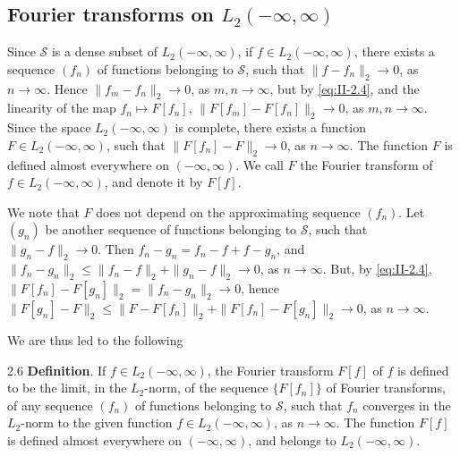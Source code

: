 \subsection*{Fourier transforms on $L_{2}(-\infty,\infty)$}
\noindent Since $\mathcal S$ is a dense subset of $L_{2}(-\infty,\infty)$, if $f\in L_{2}(-\infty,\infty)$, there exists a sequence $(f_{n})$ of functions belonging to $\mathcal S$, such that $\|f-f_{n}\|_{2}\to 0$, as $n\to\infty$. Hence $\|f_{m}-f_{n}\|_{2}\to 0$, as $m,n\to\infty$, but by \eqref{eq:II-2.4}, and the linearity of the map $f_{n}\mapsto F[f_{n}]$, $\|F[f_{m}]-F[f_{n}]\|_{2}\to 0$, as $m,n\to\infty$. Since the space $L_{2}(-\infty,\infty)$ is complete, there exists a function $F\in L_{2}(-\infty,\infty)$, such that $\|F[f_{n}]-F\|_{2}\to 0$, as $n\to\infty$. The function $F$ is defined almost everywhere on $(-\infty,\infty)$. We call $F$ the Fourier transform of $f\in L_{2}(-\infty,\infty)$, and denote it by $F[f]$.

We note that $F$ does not depend on the approximating sequence $(f_{n})$. Let $(g_{n})$ be another sequence of functions belonging to $\mathcal S$, such that $\|g_{n}-f\|_{2}\to 0$. Then $f_{n}-g_{n}=f_{n}-f+f-g_{n}$, and $\|f_{n}-g_{n}\|_{2}\le \|f_{n}-f\|_{2}+\|g_{n}-f\|_{2}\to 0$, as $n\to\infty$. But, by \eqref{eq:II-2.4}, $\|F[f_{n}]-F[g_{n}]\|_{2}=\|f_{n}-g_{n}\|_{2}\to 0$, hence $\|F[g_{n}]-F\|_{2}\le \|F-F[f_{n}]\|_{2}+\|F[f_{n}]-F[g_{n}]\|_{2}\to 0$, as $n\to\infty$.

We are thus led to the following

\begin{nstmt}{2.6}\label{eq:II-2.6}
\textbf{Definition}. If $f\in L_{2}(-\infty,\infty)$, the Fourier transform $F[f]$ of $f$ is defined to be the limit, in the $L_{2}$-norm, of the sequence $\{F[f_{n}]\}$ of Fourier transforms, of any sequence $(f_{n})$ of functions belonging to $\mathcal S$, such that $f_{n}$ converges in the $L_{2}$-norm to the given function $f\in L_{2}(-\infty,\infty)$, as $n\to\infty$. The function $F[f]$ is defined almost everywhere on $(-\infty,\infty)$, and belongs to $L_{2}(-\infty,\infty)$.
\end{nstmt}


